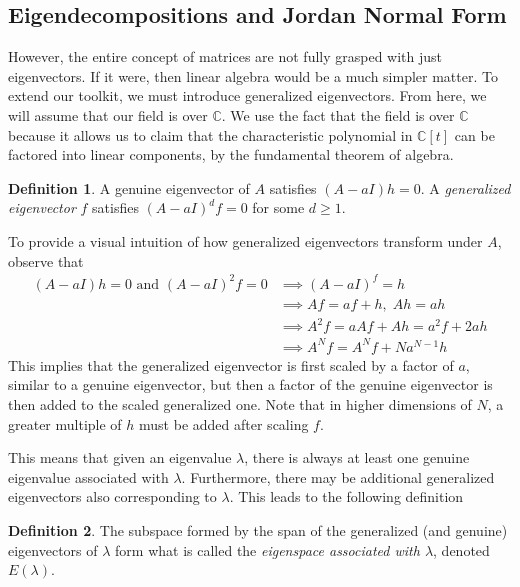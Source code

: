 \documentclass{article}
\theoremstyle{remark}
\theoremstyle{definition}
\newtheorem{definition}{Definition}[section]
\begin{document}
  \subsection{Eigendecompositions and Jordan Normal Form}

    However, the entire concept of matrices are not fully grasped with just eigenvectors. If it were, then linear algebra would be a much simpler matter. To extend our toolkit, we must introduce generalized eigenvectors. From here, we will assume that our field is over $\mathbb{C}$. We use the fact that the field is over $\mathbb{C}$ because it allows us to claim that the characteristic polynomial in $\mathbb{C}[t]$ can be factored into linear components, by the fundamental theorem of algebra. 

    \begin{definition}
    A genuine eigenvector of $A$ satisfies $(A-aI)h = 0$. A \textit{generalized eigenvector} $f$ satisfies $(A-a I)^{d} f = 0$ for some $d \geq 1$. 
    \end{definition}

    To provide a visual intuition of how generalized eigenvectors transform under $A$, observe that 
    \begin{align}
        (A - aI) h = 0 \text{ and } (A - aI)^2 f = 0 & \implies (A - aI)^f = h \\
        & \implies A f = a f + h, \; Ah = ah \\
        & \implies A^2 f = a A f + A h = a^2 f + 2 a h \\
        & \implies A^N f = A^N f + N a^{N-1} h 
    \end{align}
    This implies that the generalized eigenvector is first scaled by a factor of $a$, similar to a genuine eigenvector, but then a factor of the genuine eigenvector is then added to the scaled generalized one. Note that in higher dimensions of $N$, a greater multiple of $h$ must be added after scaling $f$. 

    This means that given an eigenvalue $\lambda$, there is always at least one genuine eigenvalue associated with $\lambda$. Furthermore, there may be additional generalized eigenvectors also corresponding to $\lambda$. This leads to the following definition

    \begin{definition}
    The subspace formed by the span of the generalized (and genuine) eigenvectors of $\lambda$ form what is called the \textit{eigenspace associated with $\lambda$}, denoted $E(\lambda)$. 
    \end{definition}
\end{document}
